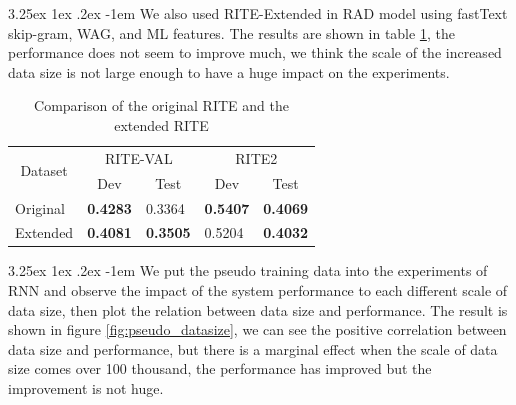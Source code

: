 \documentclass[12pt]{article}
\makeatletter
\renewcommand\paragraph{\@startsection{paragraph}{5}{\z@}%
  {3.25ex \@plus1ex \@minus.2ex}%
  {-1em}%
  {\normalfont\normalsize\bfseries}}
\makeatother
\begin{document}
\begin{CJK*}{UTF8}{bkai}
\begin{spacing}{1.77}
\paragraph{}
We also used RITE-Extended in RAD model using fastText skip-gram, WAG, and ML features. The results are shown in table \ref{result:rite_extended}, the performance does not seem to improve much, we think the scale of the increased data size is not large enough to have a huge impact on the experiments.

\begin{table}[H]
  \centering
  \setlength{\extrarowheight}{-3pt}
  \caption{Comparison of the original RITE and the extended RITE}
  \label{result:rite_extended}
  \begin{tabular}{|l|l|l|l|l|}
  \hline
  \multicolumn{1}{|c|}{\multirow{2}{*}{Dataset}} & \multicolumn{2}{c|}{RITE-VAL} & \multicolumn{2}{c|}{RITE2} \\ \cline{2-5}
  \multicolumn{1}{|c|}{} & \multicolumn{1}{c|}{Dev} & \multicolumn{1}{c|}{Test} & \multicolumn{1}{c|}{Dev} & \multicolumn{1}{c|}{Test} \\ \hline
  Original & \textbf{0.4283} & 0.3364 & \textbf{0.5407} & \textbf{0.4069} \\ \hline
  Extended & \textbf{0.4081} & \textbf{0.3505} & 0.5204 & \textbf{0.4032} \\ \hline
  \end{tabular}
\end{table}

\paragraph{}
We put the pseudo training data into the experiments of RNN and observe the impact of the system performance to each different scale of data size, then plot the relation between data size and performance. The result is shown in figure \ref{fig:pseudo_datasize}, we can see the positive correlation between data size and performance, but there is a marginal effect when the scale of data size comes over 100 thousand, the performance has improved but the improvement is not huge.


\end{spacing}
\end{CJK*}
\end{document}

